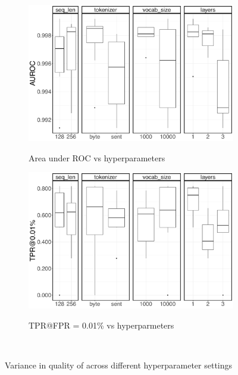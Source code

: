 \begin{figure}
\begin{subfigure}{0.8\linewidth}
	\centering
    \includegraphics[width=0.95\linewidth,alt={Box plots for area under ROC comparison for different seq len, tokenizers, vocab size, and layers.}]{urltran/figures/roc_hyperparams.png}
\caption{Area under ROC vs hyperparameters}
\label{fig:urltran:pretrain_scratch:roc}
\end{subfigure}
\begin{subfigure}{0.8\linewidth}
	\centering
\includegraphics[width=0.95\linewidth,alt={Box plots for TPR@FPR=0.01\% comparison across different seq len, tokenizers, vocab size, and layers.}]{urltran/figures/tpr_0.01_hyperparams.png}
\caption{TPR@FPR = 0.01\% vs hyperparmeters}
\label{fig:urltran:pretrain_scratch:tpr}
\end{subfigure}
\caption{Variance in quality of \URLTranSysc across different hyperparameter settings}\
\label{fig:urltran:pretrain_scratch}
\end{figure}


